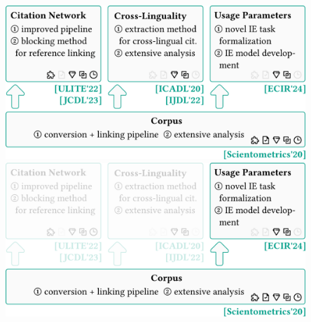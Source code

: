 \documentclass[en,16:9,smallfoot]{sdqbeamer}
\begin{document}
   \begin{frame}[plain]
       \vspace{1.25cm}
       \begin{overprint}
            \centering\includegraphics[width=0.85\textwidth]{imgs/contrib_overview_dis_var}
            \centering\includegraphics[width=0.85\textwidth]{imgs/contrib_overview_dis_var_sel}
       \end{overprint}
   \end{frame}

\end{document}
